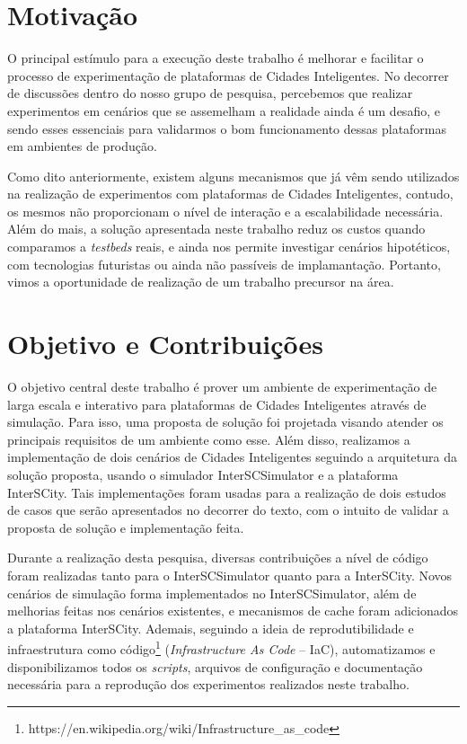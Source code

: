 \section{Motivação}

O principal estímulo para a execução deste trabalho é melhorar e facilitar o processo de experimentação de plataformas de Cidades Inteligentes.
No decorrer de discussões dentro do nosso grupo de pesquisa, percebemos que realizar experimentos em cenários que se assemelham a realidade ainda é um desafio, e sendo esses essenciais para validarmos o bom
funcionamento dessas plataformas em ambientes de produção.

Como dito anteriormente, existem alguns mecanismos que já vêm sendo utilizados na realização de experimentos com plataformas de Cidades Inteligentes, contudo, os mesmos não proporcionam o nível de interação
e a escalabilidade necessária.
Além do mais, a solução apresentada neste trabalho reduz os custos quando comparamos a \textit{testbeds} reais, e ainda nos permite investigar cenários hipotéticos, com tecnologias futuristas ou ainda não
passíveis de implamantação.
Portanto, vimos a oportunidade de realização de um trabalho precursor na área.

\section{Objetivo e Contribuições}

O objetivo central deste trabalho é prover um ambiente de experimentação de larga escala e interativo para plataformas de Cidades Inteligentes através de simulação.
Para isso, uma proposta de solução foi projetada visando atender os principais requisitos de um ambiente como esse.
Além disso, realizamos a implementação de dois cenários de Cidades Inteligentes seguindo a arquitetura da solução proposta, usando o simulador InterSCSimulator e a plataforma InterSCity.
Tais implementações foram usadas para a realização de dois estudos de casos que serão apresentados no decorrer do texto, com o intuito de validar a proposta de solução e implementação feita.

Durante a realização desta pesquisa, diversas contribuições a nível de código foram realizadas tanto para o InterSCSimulator quanto para a InterSCity.
Novos cenários de simulação forma implementados no InterSCSimulator, além de melhorias feitas nos cenários existentes, e mecanismos de cache foram adicionados a plataforma InterSCity.
Ademais, seguindo a ideia de reprodutibilidade e infraestrutura como código\footnote{https://en.wikipedia.org/wiki/Infrastructure\_as\_code} (\textit{Infrastructure As Code} -- IaC), automatizamos e
disponibilizamos todos os \textit{scripts}, arquivos de configuração e documentação necessária para a reprodução dos experimentos realizados neste trabalho.


